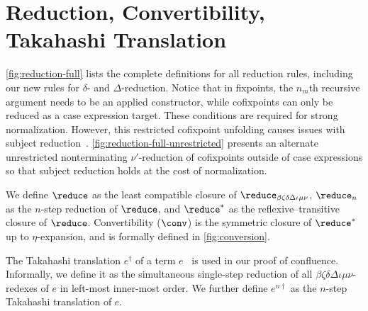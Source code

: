 \section{Reduction, Convertibility, Takahashi Translation}\label{sec:red-conv-trans}



\autoref{fig:reduction-full} lists the complete definitions for all reduction rules, including our new rules for $\delta$- and $\Delta$-reduction.
Notice that in fixpoints, the $n_m$th recursive argument needs to be an applied constructor, while cofixpoints can only be reduced as a case expression target.
These conditions are required for strong normalization.
However, this restricted cofixpoint unfolding causes issues with subject reduction~\citep{cc-hat-omega}.
\autoref{fig:reduction-full-unrestricted} presents an alternate unrestricted nonterminating $\nu'$-reduction of cofixpoints outside of case expressions so that subject reduction holds at the cost of normalization.

We define $\reduce$ as the least compatible closure of $\reduce_{\beta\zeta\delta\Delta\iota\mu\nu}$, $\reduce_n$ as the $n$-step reduction of $\reduce$, and $\reduce^*$ as the reflexive--transitive closure of $\reduce$.
Convertibility ($\conv$) is the symmetric closure of $\reduce^*$ up to $\eta$-expansion, and is formally defined in \autoref{fig:conversion}.

The Takahashi translation $e^\dagger$ of a term $e$~\citep{takahashitrans} is used in our proof of confluence.
Informally, we define it as the simultaneous single-step reduction of all $\beta\zeta\delta\Delta\iota\mu\nu$-redexes of $e$ in left-most inner-most order.
We further define $e^{n\dagger}$ as the $n$-step Takahashi translation of $e$.

